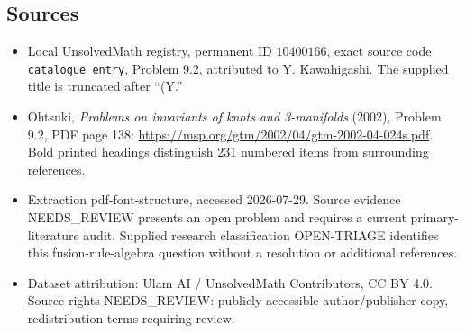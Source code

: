 \documentclass[11pt]{article}
\begin{document}
\subsection{Sources}
\begin{itemize}
\item Local UnsolvedMath registry, permanent ID \(10400166\), exact source code \texttt{catalogue entry}, Problem 9.2, attributed to Y. Kawahigashi. The supplied title is truncated after ``(Y.''
\item Ohtsuki, \emph{Problems on invariants of knots and 3-manifolds} (2002), Problem 9.2, PDF page 138: \url{https://msp.org/gtm/2002/04/gtm-2002-04-024s.pdf}. Bold printed headings distinguish 231 numbered items from surrounding references.
\item Extraction pdf-font-structure, accessed 2026-07-29. Source evidence NEEDS\_REVIEW presents an open problem and requires a current primary-literature audit. Supplied research classification OPEN-TRIAGE identifies this fusion-rule-algebra question without a resolution or additional references.
\item Dataset attribution: Ulam AI / UnsolvedMath Contributors, CC BY 4.0. Source rights NEEDS\_REVIEW: publicly accessible author/publisher copy, redistribution terms requiring review.
\end{itemize}
\end{document}
